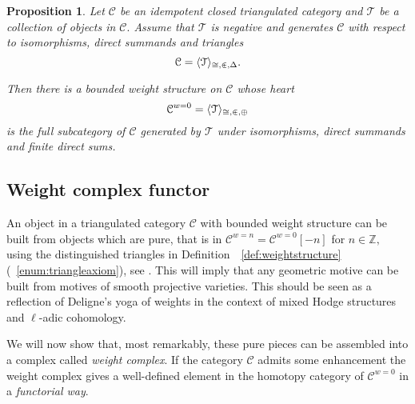 \documentclass{amsart}
\theoremstyle{plain}
\newtheorem{proposition}[theorem]{Proposition}
\theoremstyle{TheoremNum}
\theoremstyle{definition}
\theoremstyle{remark}
\numberwithin{equation}{section}
\newcommand{\Z}{\mathbb{Z}}
\newcommand{\Cc}{\mathcal{C}}
\newcommand{\Tt}{\mathcal{T}}
\begin{document}
\begin{proposition}\label{prop:defineweightstructure}
Let $\Cc$ be an idempotent closed triangulated category and $\Tt$ be a collection of objects in $\Cc.$ Assume that $\Tt$ is negative and generates $\Cc$ with respect to isomorphisms, direct summands and triangles
$$\Cc=\langle \Tt \rangle_{\cong, \inplus, \Delta}.$$

Then there is a bounded weight structure on $\Cc$ whose heart
$$\Cc^{w=0}=\langle \Tt \rangle_{\cong,\inplus,\oplus}$$
is the full subcategory of $\Cc$ generated by $\Tt$ under isomorphisms, direct summands and finite direct sums.
\end{proposition} 
\subsection{Weight complex functor} An object in a triangulated category $\Cc$ with bounded weight structure can be built from objects which are pure, that is in $\Cc^{w=n}=\Cc^{w=0}[-n]$ for $n\in \Z,$ using the distinguished triangles in Definition~~\ref{def:weightstructure}(~\ref{enum:triangleaxiom}), see \cite[Proposition 1.5.6]{bondarko_weight_2010}. This will imply that any geometric motive can be built from motives of smooth projective varieties. This should be seen as a reflection of Deligne's yoga of weights in the context of mixed Hodge structures and $\ell$-adic cohomology. 

We will now show that, most remarkably, these pure pieces can be assembled into a complex called \emph{weight complex}. If the category $\Cc$ admits some enhancement the weight complex gives a well-defined element in the homotopy category of $\Cc^{w=0}$ in a \emph{functorial way}.
\end{document}
